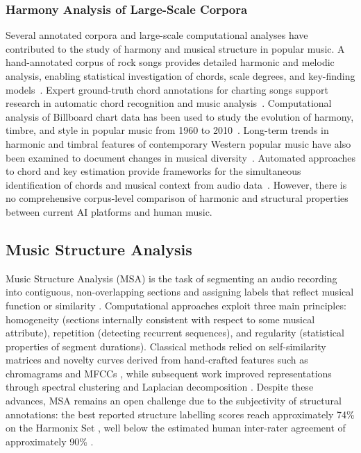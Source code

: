 \documentclass{article}
\begin{document}
\subsubsection{Harmony Analysis of Large-Scale Corpora}
Several annotated corpora and large-scale computational analyses have contributed to the study of harmony and musical structure in popular music. A hand-annotated corpus of rock songs provides detailed harmonic and melodic analysis, enabling statistical investigation of chords, scale degrees, and key-finding models~\citep{temperley2013statistical}. Expert ground-truth chord annotations for charting songs support research in automatic chord recognition and music analysis~\citep{burgoyne2011expert}. Computational analysis of Billboard chart data has been used to study the evolution of harmony, timbre, and style in popular music from 1960 to 2010~\citep{mauch2015evolution}. Long-term trends in harmonic and timbral features of contemporary Western popular music have also been examined to document changes in musical diversity~\citep{serra2012measuring}. Automated approaches to chord and key estimation provide frameworks for the simultaneous identification of chords and musical context from audio data~\citep{mauch2009simultaneous}. However, there is no comprehensive corpus-level comparison of harmonic and structural properties between current AI platforms and human music.

\subsection{Music Structure Analysis}
\label{sec:msa}
Music Structure Analysis (MSA) is the task of segmenting an audio recording into contiguous, non-overlapping sections and assigning labels that reflect musical function or similarity \citep{nieto2020audio}. Computational approaches exploit three main principles: homogeneity (sections internally consistent with respect to some musical attribute), repetition (detecting recurrent sequences), and regularity (statistical properties of segment durations). Classical methods relied on self-similarity matrices and novelty curves derived from hand-crafted features such as chromagrams and MFCCs \citep{foote2000automatic, mcfee2014learning}, while subsequent work improved representations through spectral clustering \citep{levy2008structural, serra2012unsupervised} and Laplacian decomposition \citep{mcfee2014learning}. Despite these advances, MSA remains an open challenge due to the subjectivity of structural annotations: the best reported structure labelling scores reach approximately 74\% on the Harmonix Set \citep{taejun2023allinone}, well below the estimated human inter-rater agreement of approximately 90\% \citep{nieto2020audio}.
\end{document}
